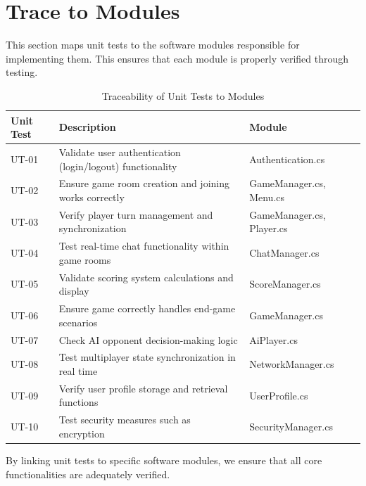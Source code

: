 \documentclass[12pt, titlepage]{article}
\begin{document}
\section{Trace to Modules}
This section maps unit tests to the software modules responsible for implementing them. This ensures that each module is properly verified through testing.

\begin{table}[h]
    \centering
    \begin{tabularx}{\textwidth}{|l|X|l|}
        \hline
        \textbf{Unit Test} & \textbf{Description} & \textbf{Module} \\
        \hline
        UT-01 & Validate user authentication (login/logout) functionality & Authentication.cs \\
        UT-02 & Ensure game room creation and joining works correctly & GameManager.cs, Menu.cs \\
        UT-03 & Verify player turn management and synchronization & GameManager.cs, Player.cs \\
        UT-04 & Test real-time chat functionality within game rooms & ChatManager.cs \\
        UT-05 & Validate scoring system calculations and display & ScoreManager.cs \\
        UT-06 & Ensure game correctly handles end-game scenarios & GameManager.cs \\
        UT-07 & Check AI opponent decision-making logic & AiPlayer.cs \\
        UT-08 & Test multiplayer state synchronization in real time & NetworkManager.cs \\
        UT-09 & Verify user profile storage and retrieval functions & UserProfile.cs \\
        UT-10 & Test security measures such as encryption & SecurityManager.cs \\
        \hline
    \end{tabularx}
    \caption{Traceability of Unit Tests to Modules}
    \label{tab:trace_modules}
\end{table}

By linking unit tests to specific software modules, we ensure that all core functionalities are adequately verified.
\end{document}
